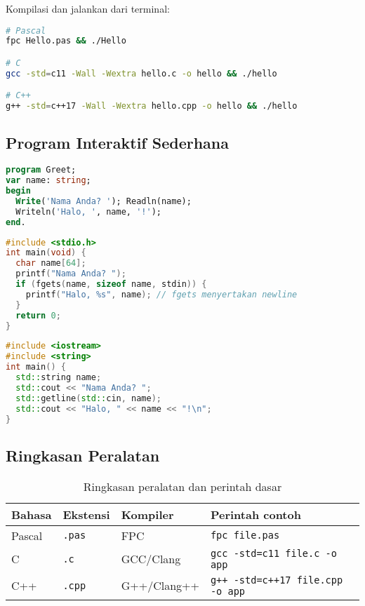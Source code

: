 \documentclass[../main.tex]{subfiles}
\begin{document}
Kompilasi dan jalankan dari terminal:
\begin{lstlisting}[language=bash]
# Pascal
fpc Hello.pas && ./Hello

# C
gcc -std=c11 -Wall -Wextra hello.c -o hello && ./hello

# C++
g++ -std=c++17 -Wall -Wextra hello.cpp -o hello && ./hello
\end{lstlisting}

\subsection{Program Interaktif Sederhana}
\begin{lstlisting}[language=Pascal, caption={Input nama pada Pascal}]
program Greet;
var name: string;
begin
  Write('Nama Anda? '); Readln(name);
  Writeln('Halo, ', name, '!');
end.
\end{lstlisting}

\begin{lstlisting}[language=C, caption={Input nama pada C}]
#include <stdio.h>
int main(void) {
  char name[64];
  printf("Nama Anda? ");
  if (fgets(name, sizeof name, stdin)) {
    printf("Halo, %s", name); // fgets menyertakan newline
  }
  return 0;
}
\end{lstlisting}

\begin{lstlisting}[language=C++, caption={Input nama pada C++}]
#include <iostream>
#include <string>
int main() {
  std::string name;
  std::cout << "Nama Anda? ";
  std::getline(std::cin, name);
  std::cout << "Halo, " << name << "!\n";
}
\end{lstlisting}

\subsection{Ringkasan Peralatan}
\begin{table}[h]
  \centering
  \caption{Ringkasan peralatan dan perintah dasar}
  \begin{tabular}{@{}llll@{}}
    \toprule
    Bahasa & Ekstensi & Kompiler & Perintah contoh \\
    \midrule
    Pascal & \texttt{.pas} & FPC & \texttt{fpc file.pas} \\
    C & \texttt{.c} & GCC/Clang & \texttt{gcc -std=c11 file.c -o app} \\
    C++ & \texttt{.cpp} & G++/Clang++ & \texttt{g++ -std=c++17 file.cpp -o app} \\
    \bottomrule
  \end{tabular}
\end{table}
\end{document}
